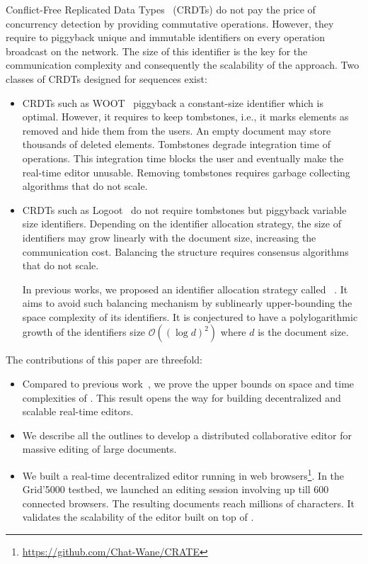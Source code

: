 Conflict-Free Replicated Data Types~\cite{shapiro2011comprehensive} (CRDTs) do
not pay the price of concurrency detection by providing commutative
operations. However, they require to piggyback unique and immutable identifiers
on every operation broadcast on the network. The size of this identifier is the
key for the communication complexity and consequently the scalability of the
approach. Two classes of CRDTs designed for sequences exist:
\begin{itemize}
\item CRDTs such as WOOT~\cite{oster2006data} piggyback a constant-size
  identifier which is optimal. However, it requires to keep tombstones, i.e., it
  marks elements as removed and hide them from the users. An empty document may
  store thousands of deleted elements. Tombstones degrade integration time of
  operations. This integration time blocks the user and eventually make the
  real-time editor unusable. Removing tombstones requires garbage
  collecting algorithms that do not scale.
\item CRDTs such as Logoot~\cite{weiss2010logootundo} do not require tombstones
  but piggyback variable size identifiers. Depending on the identifier
  allocation strategy, the size of identifiers may grow linearly with the
  document size, increasing the communication cost. Balancing the structure
  requires consensus algorithms that do not scale.

  In previous works, we proposed an identifier allocation strategy called
  \LSEQ~\cite{nedelec2013concurrency, nedelec2013lseq}. It aims to avoid such
  balancing mechanism by sublinearly upper-bounding the space complexity of its
  identifiers. It is conjectured to have a polylogarithmic growth of the
  identifiers size $\mathcal{O}((\log d)^2)$ where $d$ is the document
  size. %
\end{itemize}

The contributions of this paper are threefold:
\begin{itemize}
\item Compared to previous work~\cite{nedelec2013concurrency, nedelec2013lseq},
  we prove the upper bounds on space and time complexities of \LSEQ. This result
  opens the way for building decentralized and scalable real-time editors.
\item We describe all the outlines to develop a distributed
  collaborative editor for massive editing of large documents.
\item We built a real-time decentralized editor running in web
  browsers\footnote{\url{https://github.com/Chat-Wane/CRATE}}. In the Grid'5000
  testbed, we launched an editing session involving up till 600 connected
  browsers. The resulting documents reach millions of characters. It validates
  the scalability of the editor built on top of \LSEQ.
\end{itemize}

